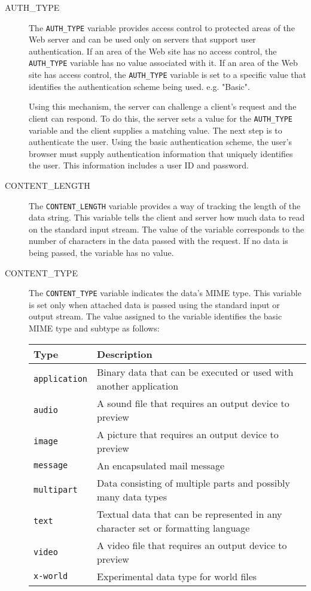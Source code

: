\begin{description}

\item[AUTH\_TYPE]

The \verb|AUTH_TYPE| variable provides access control to protected areas of
the Web server and can be used only on servers that support user
authentication. If an area of the Web site has no access control, the
\verb|AUTH_TYPE| variable has no value associated with it. If an area of the
Web site has access control, the \verb|AUTH_TYPE| variable is set to a specific
value that identifies the authentication scheme being used. e.g. "Basic".

Using this mechanism, the server can challenge a client's request and the
client can respond. To do this, the server sets a value for the
\verb|AUTH_TYPE| variable and the client supplies a matching value. The next
step is to authenticate the user. Using the basic authentication scheme, the
user's browser must supply authentication information that uniquely
identifies the user. This information includes a user ID and password.


\item[CONTENT\_LENGTH]

The \verb|CONTENT_LENGTH| variable provides a way of tracking the length of the
data string. This variable tells the client and server how much data to read on
the standard input stream. The value of the variable corresponds to the number
of characters in the data passed with the request. If no data is being passed,
the variable has no value.


\item[CONTENT\_TYPE]

The \verb|CONTENT_TYPE| variable indicates the data's MIME type. This
variable is set only when attached data is passed using the standard input
or output stream. The value assigned to the variable identifies the basic MIME
type and subtype as follows:
\begin{center}
\begin{longtable}{|l|p{10cm}|}
\hline
{\bf Type} & {\bf Description}\\
\hline
\verb|application| & Binary data that can be executed or used with another 
application\\\hline
\verb|audio| & A sound file that requires an output device to preview\\\hline
\verb|image| & A picture that requires an output device to preview\\\hline
\verb|message| & An encapsulated mail message\\\hline
\verb|multipart| & Data consisting of multiple parts and possibly many data 
types\\\hline
\verb|text| & Textual data that can be represented in any character set or formatting language\\\hline
\verb|video| & A video file that requires an output device to preview\\\hline
\verb|x-world|   & Experimental data type for world files\\\hline
\end{longtable}
\end{center}


\end{description}
